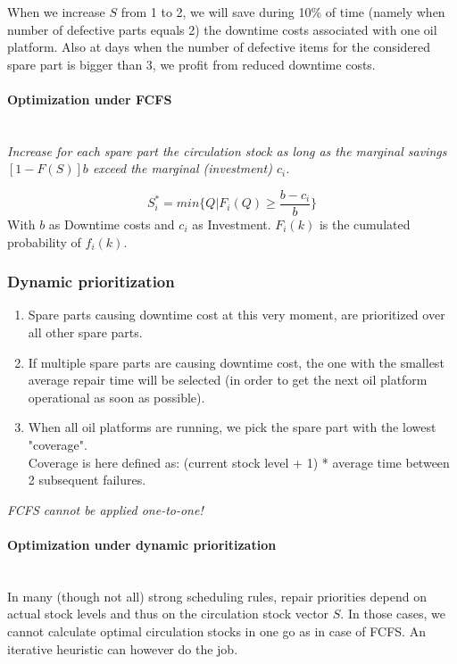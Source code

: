 When we increase $S$ from 1 to 2, we will save during 10\% of time (namely
when number of defective parts equals 2) the downtime costs associated
with one oil platform. Also at days when the number of defective items for
the considered spare part is bigger than 3, we profit from reduced
downtime costs.

\paragraph{Optimization under FCFS}\mbox{}\\
\emph{Increase for each spare part the circulation stock as long as the
	marginal savings $[1-F(S)] b$ exceed the marginal (investment)
	$c_i$.}

\begin{equation}
S_i^* = min\{Q | F_i(Q) \ge \frac{b-c_i}{b}\}
\end{equation}
With $b$ as Downtime costs and $c_i$ as Investment. $F_i(k)$ is the cumulated
probability of $f_i(k)$.

\subsubsection{Dynamic prioritization}

\begin{enumerate}
	\tightlist
	\item Spare parts causing downtime cost at this very moment, are prioritized
	over all other spare parts.
	\item If multiple spare parts are causing downtime cost, the one with the
	smallest average repair time will be selected (in order to get the next oil
	platform operational as soon as possible).
	\item When all oil platforms are running, we pick the spare part with the
	lowest "coverage".\\
	Coverage is here defined as: (current stock level +
	1) * average time between 2 subsequent failures.
\end{enumerate}

\emph{FCFS cannot be applied one-to-one!}

\paragraph{Optimization under dynamic prioritization}\mbox{}\\
In many (though not all) strong scheduling rules, repair priorities depend
on actual stock levels and thus on the circulation stock vector $S$. In
those cases, we cannot calculate optimal circulation stocks in one go as
in case of FCFS. An iterative heuristic can however do the job.

